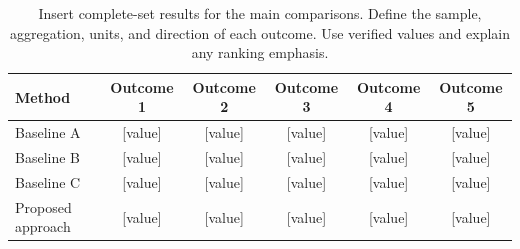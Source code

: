 \begin{table}[!ht]\centering\small
\caption{\suggest Insert complete-set results for the main comparisons. Define the sample, aggregation, units, and direction of each outcome. Use verified values and explain any ranking emphasis.}
\label{tab:primary}
\setlength{\tabcolsep}{6pt}
\begin{tabular}{lccccc}\toprule
Method & Outcome 1 & Outcome 2 & Outcome 3 & Outcome 4 & Outcome 5\\\midrule
Baseline A & [value] & [value] & [value] & [value] & [value]\\
Baseline B & [value] & [value] & [value] & [value] & [value]\\
Baseline C & [value] & [value] & [value] & [value] & [value]\\
Proposed approach & [value] & [value] & [value] & [value] & [value]\\
\bottomrule\end{tabular}
\end{table}
